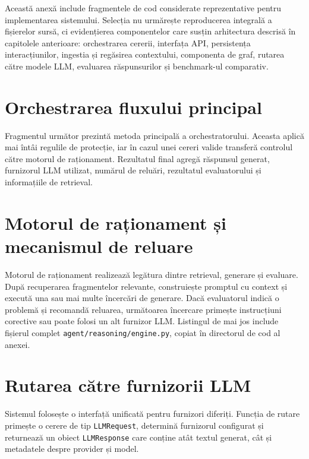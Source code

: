 \documentclass[12pt, a4paper, oneside, romanian]{teza-upb}
\begin{document}
Această anexă include fragmentele de cod considerate reprezentative pentru implementarea sistemului. Selecția nu urmărește reproducerea integrală a fișierelor sursă, ci evidențierea componentelor care susțin arhitectura descrisă în capitolele anterioare: orchestrarea cererii, interfața API, persistența interacțiunilor, ingestia și regăsirea contextului, componenta de graf, rutarea către modele LLM, evaluarea răspunsurilor și benchmark-ul comparativ.

\section{Orchestrarea fluxului principal}

Fragmentul următor prezintă metoda principală a orchestratorului. Aceasta aplică mai întâi regulile de protecție, iar în cazul unei cereri valide transferă controlul către motorul de raționament. Rezultatul final agregă răspunsul generat, furnizorul LLM utilizat, numărul de reluări, rezultatul evaluatorului și informațiile de retrieval.

\label{anexa:orchestrator-flow}


\section{Motorul de raționament și mecanismul de reluare}

Motorul de raționament realizează legătura dintre retrieval, generare și evaluare. După recuperarea fragmentelor relevante, construiește promptul cu context și execută una sau mai multe încercări de generare. Dacă evaluatorul indică o problemă și recomandă reluarea, următoarea încercare primește instrucțiuni corective sau poate folosi un alt furnizor LLM. Listingul de mai jos include fișierul complet \texttt{agent/reasoning/engine.py}, copiat în directorul de cod al anexei.

\label{anexa:reasoning-engine}


\section{Rutarea către furnizorii LLM}

Sistemul folosește o interfață unificată pentru furnizori diferiți. Funcția de rutare primește o cerere de tip \texttt{LLMRequest}, determină furnizorul configurat și returnează un obiect \texttt{LLMResponse} care conține atât textul generat, cât și metadatele despre provider și model.
\end{document}
